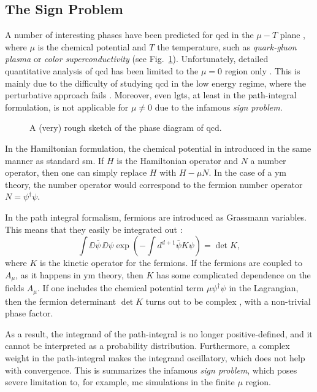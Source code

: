 \subsection{The Sign Problem}
\label{sub:the_sign_problem}

A number of interesting phases have been predicted for \ac{qcd} in the $\mu - T$ plane \cite{aarts2016qcd}, where $\mu$ is the chemical potential and $T$ the temperature, such as \emph{quark-gluon plasma} \cite{detar2009qcdthermo} or \emph{color superconductivity} \cite{alford2001coloursc} (see Fig.~\ref{fig:qcd_phase_diagram}).
Unfortunately, detailed quantitative analysis of \ac{qcd} has been limited to the $\mu = 0$ region only \cite{aarts2016qcd}.
This is mainly due to the difficulty of studying \ac{qcd} in the low energy regime, where the perturbative approach fails \cite{peskin1995qft, creutz1985book}.
Moreover, even \ac{lgt}s, at least in the path-integral formulation, is not applicable for $\mu \neq 0$ due to the infamous \emph{sign problem}.


\begin{figure}[t]
    \centering
    
    \caption{A (very) rough sketch of the phase diagram of \ac{qcd}.}
    \label{fig:qcd_phase_diagram}
\end{figure}


In the Hamiltonian formulation, the chemical potential in introduced in the same manner as standard \ac{sm}.
If $H$ is the Hamiltonian operator and $N$ a number operator, then one can simply replace $H$ with $H - \mu N$.
In the case of a \ac{ym} theory, the number operator would correspond to the fermion number operator $N = \psi^{\dagger} \psi$.

In the path integral formalism, fermions are introduced as Grassmann variables.
This means that they easily be integrated out \cite{peskin1995qft, aarts2016qcd}:
\begin{equation}
    \int \DD \overline{\psi}\, \DD \psi \exp(-\int d^{d+1} \overline{\psi} K \psi) = \det K,
\end{equation}
where $K$ is the kinetic operator for the fermions.
If the fermions are coupled to $A_{\mu}$, as it happens in \ac{ym} theory, then $K$ has some complicated dependence on the fields $A_{\mu}$.
If one includes the chemical potential term $\mu \psi^{\dagger} \psi$ in the Lagrangian, then the fermion determinant $\det K$ turns out to be complex \cite{aarts2016qcd}, with a non-trivial phase factor.

As a result, the integrand of the path-integral is no longer positive-defined, and it cannot be interpreted as a probability distribution.
Furthermore, a complex weight in the path-integral makes the integrand oscillatory, which does not help with convergence.
This is summarizes the infamous \emph{sign problem}, which poses severe limitation to, for example, \ac{mc} simulations in the finite $\mu$ region.
